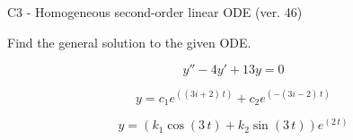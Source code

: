 \begin{exercise}
  \begin{exerciseTitle}C3 - Homogeneous second-order linear ODE (ver. 46)\end{exerciseTitle}
  \begin{exerciseStatement}
    
Find the general solution to the given ODE.

    
\[y''-4y'+13y = 0\]

  \end{exerciseStatement}
  \begin{exerciseAnswer}
    
\[y= c_{1} e^{\left(\left(3 i + 2\right) \, t\right)} + c_{2} e^{\left(-\left(3 i - 2\right) \, t\right)}\]

    
\[y= {\left(k_{1} \cos\left(3 \, t\right) + k_{2} \sin\left(3 \, t\right)\right)} e^{\left(2 \, t\right)}\]

  \end{exerciseAnswer}
\end{exercise}